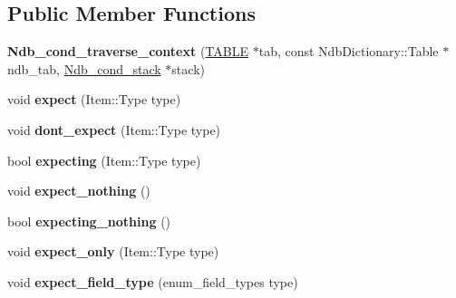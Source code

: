 \subsection*{Public Member Functions}
\begin{DoxyCompactItemize}
\item 
\mbox{\label{classNdb__cond__traverse__context_aff31f73a3359ba66be42bc7ba3d32033}} 
{\bfseries Ndb\+\_\+cond\+\_\+traverse\+\_\+context} (\mbox{\hyperlink{structTABLE}{T\+A\+B\+LE}} $\ast$tab, const Ndb\+Dictionary\+::\+Table $\ast$ndb\+\_\+tab, \mbox{\hyperlink{classNdb__cond__stack}{Ndb\+\_\+cond\+\_\+stack}} $\ast$stack)
\item 
\mbox{\label{classNdb__cond__traverse__context_adc7937468fde2fead3e9b3972a809625}} 
void {\bfseries expect} (Item\+::\+Type type)
\item 
\mbox{\label{classNdb__cond__traverse__context_ab7ee6a4c6eca44459cdea23fc674b540}} 
void {\bfseries dont\+\_\+expect} (Item\+::\+Type type)
\item 
\mbox{\label{classNdb__cond__traverse__context_a7486f89f614fdd124e706426729e11b8}} 
bool {\bfseries expecting} (Item\+::\+Type type)
\item 
\mbox{\label{classNdb__cond__traverse__context_a2162d62e2b1c1a6b26707c8d5a2189db}} 
void {\bfseries expect\+\_\+nothing} ()
\item 
\mbox{\label{classNdb__cond__traverse__context_a91966b5145c2395bbf93d2891fc4c79e}} 
bool {\bfseries expecting\+\_\+nothing} ()
\item 
\mbox{\label{classNdb__cond__traverse__context_a32947bbf67fe950a2f7e6d973a05388d}} 
void {\bfseries expect\+\_\+only} (Item\+::\+Type type)
\item 
\mbox{\label{classNdb__cond__traverse__context_aa0303c700c15b631283480d63aad204e}} 
void {\bfseries expect\+\_\+field\+\_\+type} (enum\+\_\+field\+\_\+types type)
\item 

\end{DoxyCompactItemize}

